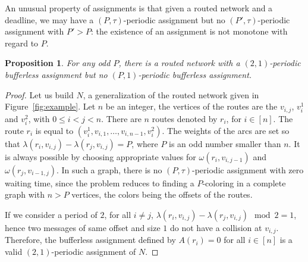\documentclass[a4paper,10pt]{article}
\newtheorem{proposition}{Proposition}
\begin{document}
      An unusual property of assignments is that given a routed network and a deadline, we may have a $(P,\tau)$-periodic assignment but no $(P',\tau)$-periodic assignment with $P' > P$: the existence of an assignment is not monotone with regard to $P$.

	\begin{proposition} \label{prop:monotonic}
	 For any odd $P$, there is a routed network with a $(2,1)$-periodic bufferless assignment but no $(P,1)$-periodic bufferless assignment.
	\end{proposition}

	\begin{proof}
      Let us build $N$, a generalization of the routed network given in Figure~\ref{fig:example}. 
      Let $n$ be an integer, the vertices of the routes are the $v_{i,j}$, $v_i^1$ and $v_i^2$, with $0 \leq i < j <n$. 
      There are $n$ routes denoted by $r_i$, for $i \in [n]$. The route $r_i$ is equal to $(v_i^1,v_{i,1},\dots,v_{i,n-1},v_i^2)$. The weights of the arcs are set so that $\lambda(r_i, v_{i,j}) - \lambda(r_j,v_{i,j})= P$, where $P$ is an odd number smaller than $n$. It is always possible by choosing appropriate values for $\omega(r_i,v_{i,j-1})$ and $\omega(r_j,v_{i-1,j})$. In such a graph, there is no $(P,\tau)$-periodic assignment with zero waiting time, since the problem reduces to finding a $P$-coloring in a complete graph with $n > P$ vertices, the colors being the offsets of the routes.

      If we consider a period of $2$, for all $i \neq j$, $\lambda(r_i, v_{i,j}) - \lambda(r_j, v_{i,j}) \mod 2 = 1$, hence two messages of same offset and size $1$ do not have a collision at $v_{i,j}$. Therefore, the bufferless assignment defined by $A(r_i) = 0$ for all $i \in [n]$ is a valid $(2,1)$-periodic assignment of $N$.      
	\end{proof}
\end{document}
